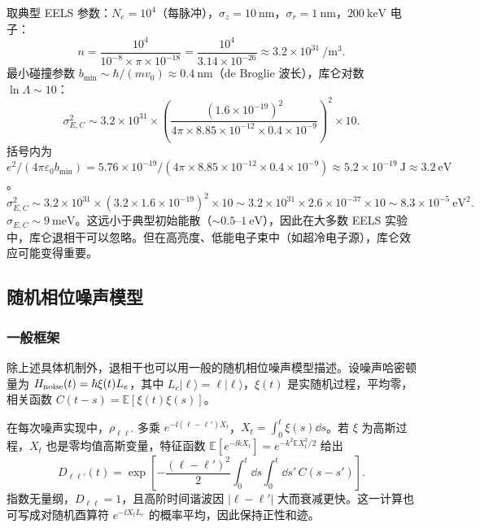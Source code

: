 \begin{exbox}[数值估计]
取典型 EELS 参数：$N_e=10^4$（每脉冲），$\sigma_z=10\ \si{\nano\metre}$，$\sigma_r=1\ \si{\nano\metre}$，$200\ \si{\kilo\electronvolt}$ 电子：
\begin{equation}
n=\frac{10^4}{10^{-8}\times\pi\times10^{-18}}=\frac{10^4}{3.14\times10^{-26}}\approx 3.2\times10^{31}\ \si{\per\metre\cubed}.
\end{equation}
最小碰撞参数 $b_{\min}\sim\hbar/(mv_0)\approx 0.4\ \si{\nano\metre}$（de Broglie 波长），库仑对数 $\ln\Lambda\sim 10$：
\begin{equation}
\sigma_{E,C}^2\sim 3.2\times10^{31}\times\left(\frac{(1.6\times10^{-19})^2}{4\pi\times8.85\times10^{-12}\times0.4\times10^{-9}}\right)^2\times 10.
\end{equation}
括号内为 $e^2/(4\pi\varepsilon_0 b_{\min})=5.76\times10^{-19}/(4\pi\times8.85\times10^{-12}\times0.4\times10^{-9})\approx 5.2\times10^{-19}\ \si{\joule}\approx 3.2\ \si{\electronvolt}$。
\begin{equation}
\sigma_{E,C}^2\sim 3.2\times10^{31}\times(3.2\times1.6\times10^{-19})^2\times 10
\sim 3.2\times10^{31}\times2.6\times10^{-37}\times 10\sim 8.3\times10^{-5}\ \si{\electronvolt\squared}.
\end{equation}
$\sigma_{E,C}\sim 9\ \si{\milli\electronvolt}$。这远小于典型初始能散（$\sim 0.5$--$1\ \si{\electronvolt}$），因此在大多数 EELS 实验中，库仑退相干可以忽略。但在高亮度、低能电子束中（如超冷电子源），库仑效应可能变得重要。

\end{exbox}

\subsection{随机相位噪声模型}

\subsubsection{一般框架}

除上述具体机制外，退相干也可以用一般的随机相位噪声模型描述。设噪声哈密顿量为 $H_{\rm noise}(t)=\hbar\xi(t)L_e$，其中 $L_e|\ell\rangle=\ell|\ell\rangle$，$\xi(t)$ 是实随机过程，平均零，相关函数 $C(t-s)=\mathbb{E}[\xi(t)\xi(s)]$。

在每次噪声实现中，$\rho_{\ell\ell'}$ 多乘 $e^{-\ii(\ell-\ell')X_t}$，$X_t=\int_0^t\xi(s)\dd s$。若 $\xi$ 为高斯过程，$X_t$ 也是零均值高斯变量，特征函数 $\mathbb{E}[e^{-\ii kX_t}]=e^{-k^2\mathbb{E}X_t^2/2}$ 给出
\begin{equation}
D_{\ell\ell'}(t)=\exp\!\left[-\frac{(\ell-\ell')^2}{2}
\int_0^t\dd s\int_0^t\dd s'\,C(s-s')\right].
\label{eq:feqo-gaussian-dephasing}
\end{equation}
指数无量纲，$D_{\ell\ell}=1$，且高阶时间谐波因 $|\ell-\ell'|$ 大而衰减更快。这一计算也可写成对随机酉算符 $e^{-\ii X_tL_e}$ 的概率平均，因此保持正性和迹。

